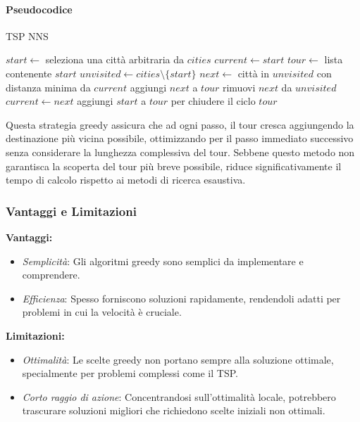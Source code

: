 
\paragraph{Pseudocodice}

\begin{algorithm}
	\caption{TSP \gls{NNS}}\label{alg:greedybestfirst}
	\begin{algorithmic}[1]
		\State $start \gets$ seleziona una città arbitraria da $cities$
		\State $current \gets start$
		\State $tour \gets$ lista contenente $start$
		\State $unvisited \gets cities \setminus \{start\}$
		\State $next \gets$ città in $unvisited$ con distanza minima da $current$
		\State aggiungi $next$ a $tour$
		\State rimuovi $next$ da $unvisited$
		\State $current \gets next$
		\EndWhile
		\State aggiungi $start$ a $tour$ per chiudere il ciclo
		\State \Return $tour$
		\EndProcedure
	\end{algorithmic}
\end{algorithm}

Questa strategia greedy assicura che ad ogni passo, il tour cresca aggiungendo la destinazione più vicina possibile, ottimizzando per il passo immediato successivo senza considerare la lunghezza complessiva del tour. Sebbene questo metodo non garantisca la scoperta del tour più breve possibile, riduce significativamente il tempo di calcolo rispetto ai metodi di ricerca esaustiva.


\subsubsection{Vantaggi e Limitazioni}

\textbf{Vantaggi:}
\begin{itemize}
	\item \textit{Semplicità}: Gli algoritmi greedy sono semplici da implementare e comprendere.
	\item \textit{Efficienza}: Spesso forniscono soluzioni rapidamente, rendendoli adatti per problemi in cui la velocità è cruciale.
\end{itemize}

\textbf{Limitazioni:}
\begin{itemize}
	\item \textit{Ottimalità}: Le scelte greedy non portano sempre alla soluzione ottimale, specialmente per problemi complessi come il \gls{TSP}.
	\item \textit{Corto raggio di azione}: Concentrandosi sull'ottimalità locale, potrebbero trascurare soluzioni migliori che richiedono scelte iniziali non ottimali.
\end{itemize}

